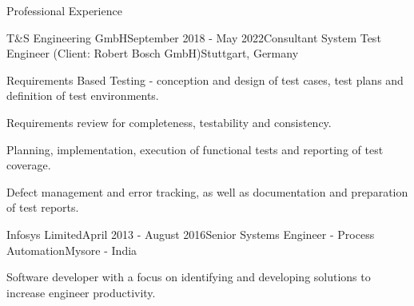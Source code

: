 \documentclass{resume} %
\begin{document}
\begin{rSection}{Professional Experience}
		\begin{rSubsection}{T\&S Engineering GmbH}{September 2018 - May 2022}{Consultant System Test Engineer (Client: Robert Bosch GmbH)}{Stuttgart, Germany}
							\fontsize{10pt}{12pt}\selectfont
			\item Requirements Based Testing - conception and design of test cases, test plans and definition of test environments.
			\item Requirements review for completeness, testability and consistency. 
			\item Planning, implementation, execution of functional tests and reporting of test coverage. 
			\item Defect management and error tracking, as well as documentation and preparation of test reports. 
		\end{rSubsection}

		\begin{rSubsection}{Infosys Limited}{April 2013 - August 2016}{Senior Systems Engineer - Process Automation}{Mysore - India}
							\fontsize{10pt}{12pt}\selectfont
			\item Software developer with a focus on identifying and developing solutions to increase engineer productivity.
		\end{rSubsection}
		
	\end{rSection}
		
		
\end{document}
